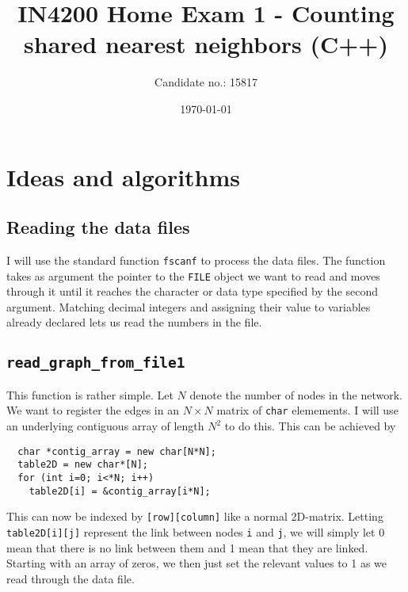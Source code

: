 \documentclass[reprint, english,notitlepage,nofootinbib]{revtex4-1}  %
\begin{document}
\title{IN4200 Home Exam 1 - Counting shared nearest neighbors (C++)}
\date{\today}
\author{Candidate no.: 15817}


\newpage

\maketitle                                %


\section{Ideas and algorithms}

\subsection{Reading the data files}

I will use the standard function \verb|fscanf| to process the data files. The function takes as argument the pointer to the \verb|FILE| object we want to read and moves through it until it reaches the character or data type specified by the second argument. Matching decimal integers and assigning their value to variables already declared lets us read the numbers in the file.


\subsection{\texttt{read\_graph\_from\_file1}} \label{sect:read1}

This function is rather simple. Let \(N\) denote the number of nodes in the network. We want to register the edges in an \(N \times N\) matrix of \verb|char| elemements. I will use an underlying contiguous array of length \(N^2\) to do this. This can be achieved by
\begin{verbatim}
  char *contig_array = new char[N*N];
  table2D = new char*[N];
  for (int i=0; i<*N; i++)
    table2D[i] = &contig_array[i*N];
\end{verbatim}
This can now be indexed by \verb|[row][column]| like a normal 2D-matrix. Letting \verb|table2D[i][j]| represent the link between nodes \verb|i| and \verb|j|, we will simply let 0 mean that there is no link between them and 1 mean that they are linked. Starting with an array of zeros, we then just set the relevant values to 1 as we read through the data file.
\end{document}
